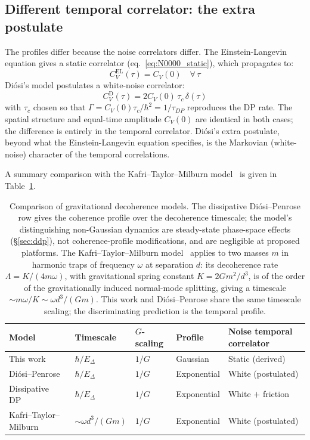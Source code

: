 \documentclass[12pt,a4paper]{article}
\theoremstyle{remark}
\begin{document}
\subsection{Different temporal correlator: the extra postulate}

The profiles differ because the noise correlators differ. The Einstein-Langevin equation
gives a static correlator (eq.~\ref{eq:N0000_static}), which propagates to:
\begin{equation}
C_V^{\text{EL}}(\tau) = C_V(0) \quad \forall\,\tau
\label{eq:corr_el}
\end{equation}
Di\'osi's model postulates a white-noise correlator:
\begin{equation}
C_V^{\text{D}}(\tau) = 2C_V(0)\,\tau_c\,\delta(\tau)
\label{eq:corr_diosi}
\end{equation}
with $\tau_c$ chosen so that $\Gamma = C_V(0)\tau_c/\hbar^2 = 1/\tau_{DP}$ reproduces
the DP rate. The spatial structure and equal-time amplitude $C_V(0)$ are identical in both
cases; the difference is entirely in the temporal correlator. Di\'osi's extra postulate,
beyond what the Einstein-Langevin equation specifies, is the Markovian (white-noise)
character of the temporal correlations.

A summary comparison with the Kafri--Taylor--Milburn model~\cite{kafri} is given in
Table~\ref{tab:models}.

\begin{table}[h]
\centering
\begin{tabular}{lllll}
\toprule
Model & Timescale & $G$-scaling & Profile & Noise temporal correlator \\
\midrule
This work & $\hbar/E_\Delta$ & $1/G$ & Gaussian & Static (derived) \\
Di\'osi--Penrose & $\hbar/E_\Delta$ & $1/G$ & Exponential & White (postulated) \\
Dissipative DP~\cite{ddp_model} & $\hbar/E_\Delta$ & $1/G$ & Exponential & White $+$ friction \\
Kafri--Taylor--Milburn & $\sim \omega d^3/(G m)$ & $1/G$ & Exponential & White (postulated) \\
\bottomrule
\end{tabular}
\caption{Comparison of gravitational decoherence models. The dissipative Di\'osi--Penrose
row gives the coherence profile over the decoherence timescale; the model's distinguishing
non-Gaussian dynamics are steady-state phase-space effects (\S\ref{sec:ddp}), not
coherence-profile modifications, and are negligible at proposed platforms. The
Kafri--Taylor--Milburn
model~\cite{kafri} applies to two masses $m$ in harmonic traps of frequency $\omega$ at
separation $d$: its decoherence rate $\Lambda = K/(4m\omega)$, with gravitational spring
constant $K = 2Gm^2/d^3$, is of the order of the gravitationally induced normal-mode
splitting, giving a timescale $\sim m\omega/K \sim \omega d^3/(Gm)$. This work and
Di\'osi--Penrose share the same timescale scaling; the discriminating prediction is the
temporal profile.}
\label{tab:models}
\end{table}
\end{document}
